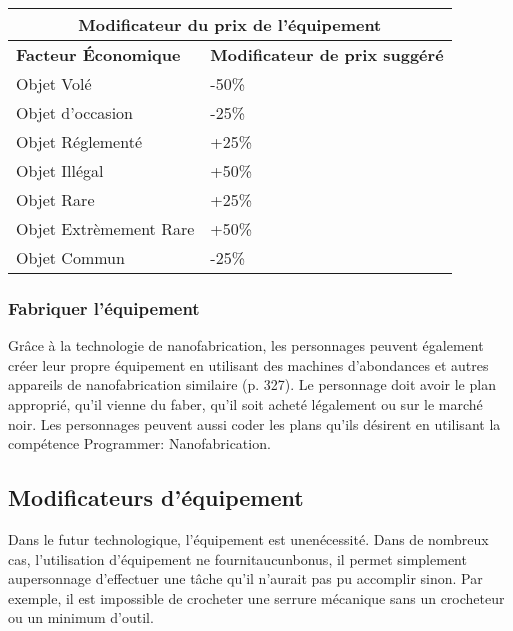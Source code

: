 \begin{table} \begin{tabular}{|l|l|} \hline

\multicolumn{2}{|c|}{\textbf{Modificateur du prix de l'équipement}}	\\ \hline

\textbf{Facteur Économique}	&\textbf{Modificateur de prix suggéré} \\ \hline

Objet Volé	&-50\% \\ \hline

Objet d'occasion	&-25\% \\ \hline

Objet Réglementé	&+25\% \\ \hline

Objet Illégal	&+50\% \\ \hline

Objet Rare	&+25\% \\ \hline

Objet Extrèmement Rare	&+50\% \\ \hline

Objet Commun	&-25\% \\ \hline

\end{tabular} \label{tab:gear-cost-modifiers} \end{table} 

\subsubsection{Fabriquer l'équipement} 

Grâce à la technologie de nanofabrication, les personnages peuvent également créer leur propre équipement en utilisant des machines d'abondances et autres appareils de nanofabrication similaire (p. 327). Le personnage doit avoir le plan approprié, qu'il vienne du faber, qu'il soit acheté légalement ou sur le marché noir. Les personnages peuvent aussi coder les plans qu'ils désirent en utilisant la compétence Programmer: Nanofabrication. 



\subsection{Modificateurs d'équipement} \label{sec:gear-modifiers} 

Dans le futur technologique, l'équipement est unenécessité. Dans de nombreux cas, l'utilisation d'équipement ne fournitaucunbonus, il permet simplement aupersonnage d'effectuer une tâche qu'il n'aurait pas pu accomplir sinon. Par exemple, il est impossible de crocheter une serrure mécanique sans un crocheteur ou un minimum d'outil. 

